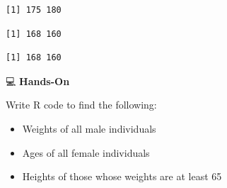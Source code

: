 \documentclass[
  letterpaper,
  DIV=11,
  numbers=noendperiod]{scrreprt}
\newenvironment{Shaded}{\begin{snugshade}}{\end{snugshade}}
\newcommand{\DecValTok}[1]{\textcolor[rgb]{0.68,0.00,0.00}{#1}}
\newcommand{\NormalTok}[1]{\textcolor[rgb]{0.00,0.23,0.31}{#1}}
\newcommand{\SpecialCharTok}[1]{\textcolor[rgb]{0.37,0.37,0.37}{#1}}
\newcommand{\StringTok}[1]{\textcolor[rgb]{0.13,0.47,0.30}{#1}}
\begin{document}
\begin{tcolorbox}
\begin{verbatim}
[1] 175 180
\end{verbatim}

\begin{Shaded}
\end{Shaded}

\begin{verbatim}
[1] 168 160
\end{verbatim}

\begin{Shaded}
\end{Shaded}

\begin{verbatim}
[1] 168 160
\end{verbatim}

\end{tcolorbox}

💻 \textbf{Hands-On}

Write R code to find the following:

\begin{itemize}
\item
  Weights of all male individuals
\item
  Ages of all female individuals
\item
  Heights of those whose weights are at least 65
\end{itemize}
\end{document}
